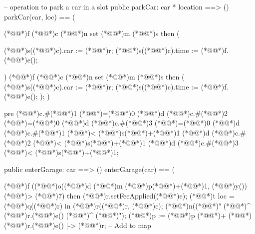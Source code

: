 \documentclass[a4paper]{article}
\begin{document}
\begin{vdm_al}
-- operation to park a car in a slot
public parkCar: car * location ==> ()
parkCar(car, loc) ==
(   
    
    (*@@*)f (*@@*)c (*@@*)n set (*@@*)m (*@@*)s then
    (

        (*@@*)s((*@@*)c).car := (*@@*)r;
        (*@@*)s((*@@*)c).time := (*@@*)f.(*@@*)e();

    )
    (*@@*)f (*@@*)c (*@@*)n set (*@@*)m (*@@*)s then
    (
        (*@@*)s((*@@*)c).car := (*@@*)r;
        (*@@*)s((*@@*)c).time := (*@@*)f.(*@@*)e();
    );
)

pre (*@@*)c.#(*@\vdmnotcovered{}@*)1 (*@\vdmnotcovered{>}@*)=(*@\vdmnotcovered{}@*)0 (*@@*)d (*@@*)c.#(*@\vdmnotcovered{}@*)2 (*@\vdmnotcovered{>}@*)=(*@\vdmnotcovered{}@*)0 (*@@*)d (*@@*)c.#(*@\vdmnotcovered{}@*)3 (*@\vdmnotcovered{>}@*)=(*@\vdmnotcovered{}@*)0 (*@@*)d (*@@*)c.#(*@\vdmnotcovered{}@*)1 (*@\vdmnotcovered{}@*)< (*@@*)s(*@\vdmnotcovered{}@*)+(*@\vdmnotcovered{}@*)1 (*@@*)d (*@@*)c.#(*@\vdmnotcovered{}@*)2 (*@\vdmnotcovered{}@*)< (*@@*)s(*@\vdmnotcovered{}@*)+(*@\vdmnotcovered{}@*)1 (*@@*)d (*@@*)c.#(*@\vdmnotcovered{}@*)3 (*@\vdmnotcovered{}@*)< (*@@*)s(*@\vdmnotcovered{}@*)+(*@\vdmnotcovered{}@*)1;

public enterGarage: car ==> ()
enterGarage(car) ==
(      
           
        (*@@*)f ((*@@*)o((*@@*)d (*@@*)m (*@@*)p(*@\vdmnotcovered{}@*)+(*@\vdmnotcovered{}@*)1, (*@@*)y()) (*@\vdmnotcovered{}@*)> (*@@*)7)  then
                    (*@@*)r.setFeeApplied((*@@*)e);
        (*@@*)t loc = (*@@*)q((*@@*)r) in 
        (*@@*)r((*@@*)r, (*@@*)c);
        (*@@*)n((*@@*)" (*@\vdmnotcovered{}@*)^ (*@@*)r.(*@@*)e() (*@\vdmnotcovered{}@*)^ (*@@*)");
        (*@@*)p := (*@@*)p (*@\vdmnotcovered{+}@*)+ (*@\vdmnotcovered{}@*){(*@@*)r.(*@@*)e() |-> (*@@*)r};  -- Add to map


\end{vdm_al}
\end{document}
